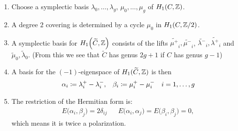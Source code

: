 \begin{frame}
    

\begin{enumerate}[<+->]
	\item Choose a symplectic basis $\lambda_0, \ldots, \lambda_g$, $\mu_0, \ldots, \mu_g$ of $H_1(C,\mathbb{Z})$.

	\item A degree $2$ covering is determined by a cycle $\mu_0$ in $H_1(C, \mathbb{Z}/2)$.

	\item A symplectic basis for $H_1\Big(\widetilde C, \mathbb{Z}\Big)$ consists of the lifts $\widetilde{\mu^+}_i, \widetilde{\mu^-}_i$, $\widetilde{\lambda^-}_i, \widetilde{\lambda^+}_i$ and $\widetilde{\mu}_0, \widetilde{\lambda}_0$. (From this we see that $\widetilde C$ has genus $2g+1$ if $C$ has genus $g-1$)

	\item A basis for the $(-1)$-eigenspace of $H_1(\widetilde C,\mathbb{Z})$ is then
	\begin{align*}
	\alpha_i \coloneqq \lambda_i^+ - \lambda_i^-, && \beta_i \coloneqq \mu_i^+ - \mu_i^- && i=1,\ldots, g
	\end{align*}

	\item The restriction of the Hermitian form is:
	\begin{align*}
	E\big(\alpha_i,\beta_j\big)= 2 \delta_{ij} && E\big(\alpha_i, \alpha_j\big) = E\big(\beta_i,\beta_j\big)=0,
	\end{align*}
	which means it is twice a polarization.
\end{enumerate}


\end{frame}